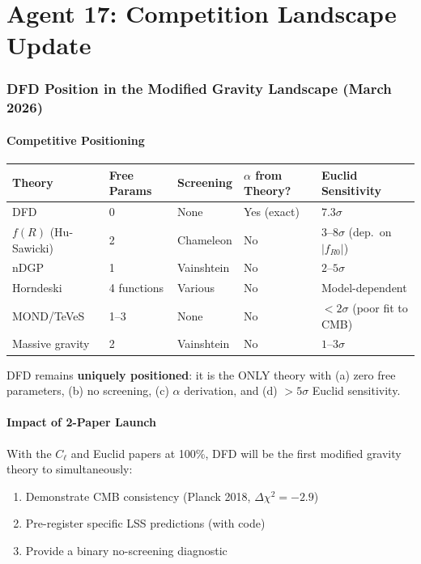\documentclass[11pt,a4paper]{article}
\begin{document}
\part{Agent 17: Competition Landscape Update}
\label{part:competition}

\section{DFD Position in the Modified Gravity Landscape (March 2026)}

\subsection{Competitive Positioning}

\begin{center}
\begin{longtable}{p{2.5cm}p{2cm}p{2cm}p{2cm}p{2.5cm}}
\toprule
\textbf{Theory} & \textbf{Free Params} & \textbf{Screening} & \textbf{$\alpha$ from Theory?} & \textbf{Euclid Sensitivity} \\
\midrule
DFD & 0 & None & Yes (exact) & $7.3\sigma$ \\
$f(R)$ (Hu-Sawicki) & 2 & Chameleon & No & $3$--$8\sigma$ (dep.\ on $|f_{R0}|$) \\
nDGP & 1 & Vainshtein & No & $2$--$5\sigma$ \\
Horndeski & 4 functions & Various & No & Model-dependent \\
MOND/TeVeS & 1--3 & None & No & $< 2\sigma$ (poor fit to CMB) \\
Massive gravity & 2 & Vainshtein & No & $1$--$3\sigma$ \\
\bottomrule
\end{longtable}
\end{center}

DFD remains \textbf{uniquely positioned}: it is the ONLY theory with (a) zero free parameters, (b) no screening, (c) $\alpha$ derivation, and (d) $> 5\sigma$ Euclid sensitivity.

\subsection{Impact of 2-Paper Launch}

With the $C_\ell$ and Euclid papers at 100\%, DFD will be the first modified gravity theory to simultaneously:
\begin{enumerate}
\item Demonstrate CMB consistency (Planck 2018, $\Delta\chi^2 = -2.9$)
\item Pre-register specific LSS predictions (with code)
\item Provide a binary no-screening diagnostic
\end{enumerate}
\end{document}

